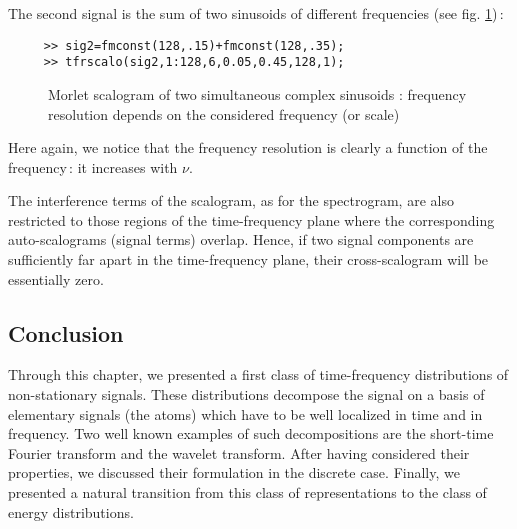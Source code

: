 The second signal is the sum of two sinusoids of different frequencies (see
fig. \ref{At4fig6})\,:
\begin{verbatim}
     >> sig2=fmconst(128,.15)+fmconst(128,.35);
     >> tfrscalo(sig2,1:128,6,0.05,0.45,128,1);
\end{verbatim}
\begin{figure}[htb]
\epsfxsize=10cm
\epsfysize=8cm
\centerline{}
\caption{\label{At4fig6}Morlet scalogram of two simultaneous complex
sinusoids : frequency resolution depends on the considered frequency (or
scale)}
\end{figure}
Here again, we notice that the frequency resolution is clearly a function
of the frequency\,: it increases with $\nu$.

  The interference terms of the scalogram, as for the spectrogram, are also
restricted to those regions of the time-frequency plane where the
corresponding auto-scalograms (signal terms) overlap. Hence, if two signal
components are sufficiently far apart in the time-frequency plane, their
cross-scalogram will be essentially zero.


\subsection{Conclusion}
  Through this chapter, we presented a first class of time-frequency
distributions of non-stationary signals. These distributions decompose
the signal on a basis of elementary signals (the atoms) which have to
be well localized in time and in frequency. Two well known examples of
such decompositions are the short-time Fourier transform and the
wavelet transform. After having considered their properties, we
discussed their formulation in the discrete case. Finally, we
presented a natural transition from this class of representations to
the class of energy distributions.
